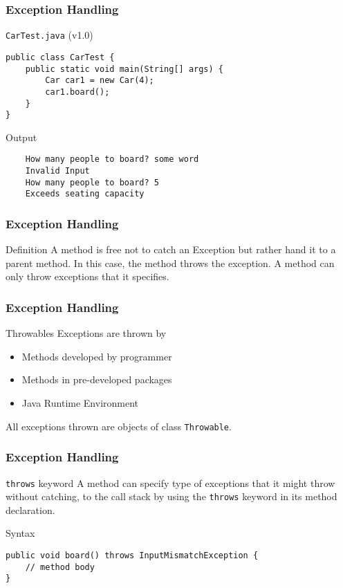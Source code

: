 \documentclass[10pt, compress]{beamer}
\begin{document}
\begin{frame}[fragile]
	\frametitle{Exception Handling}
	\begin{block}{\texttt{CarTest.java} (v1.0)}
		\begin{verbatim}
public class CarTest {
	public static void main(String[] args) {
		Car car1 = new Car(4);
		car1.board();
	}
}
		\end{verbatim}
	\end{block}
	\begin{block}{Output}
\begin{verbatim}
	How many people to board? some word
	Invalid Input
	How many people to board? 5
	Exceeds seating capacity
\end{verbatim}
	\end{block}
\end{frame}

\begin{frame}[fragile]
	\frametitle{Exception Handling}
	\begin{block}{Definition}
		A method is free not to catch an Exception but rather hand it to a parent method. In this case, the method \alert{throws} the exception. A method can only throw exceptions that it specifies.
	\end{block}
\end{frame}

\begin{frame}[fragile]
	\frametitle{Exception Handling}
	\begin{block}{Throwables}
		Exceptions are thrown by
		\begin{itemize}
			\item[] Methods developed by programmer
			\item[] Methods in pre-developed packages
			\item[] Java Runtime Environment
		\end{itemize}
		All exceptions thrown are objects of class \texttt{Throwable}.
	\end{block}
\end{frame}

\begin{frame}[fragile]
	\frametitle{Exception Handling}
	\begin{block}{\texttt{throws} keyword}
		A method can specify type of exceptions that it might throw without catching, to the call stack by using the \texttt{throws} keyword in its method declaration.
	\end{block}
	\begin{block}{Syntax}
		\begin{verbatim}
public void board() throws InputMismatchException {
	// method body
}
		\end{verbatim}
	\end{block}
\end{frame}
\end{document}
